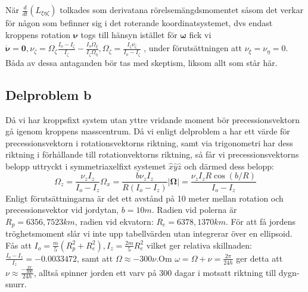 \documentclass[12pt,a4paper]{article}
\begin{document}
När $\frac{d}{dt}(L_{\xi\eta\zeta})$ tolkades som derivatana rörelsemängdsmomentet såsom det verkar för någon som befinner sig i det roterande koordinatsystemet, dvs endast kroppens rotation $\boldsymbol{\nu}$ togs till hänsyn istället för $\boldsymbol{\omega}$ fick vi $\dot{\boldsymbol{\nu}} = \mathbf{0} , \nu_{\zeta} = \Omega_{\zeta}\frac{I_o-I_{\zeta}}{I_{\zeta}} - \frac{I_o \dot{\Omega}_{\xi}}{I_{\zeta} \Omega_{\eta}} , \Omega_{\zeta} = \frac{I_{\zeta} \nu_{\zeta}}{I_o-I_{\zeta}}$ , under förutsättningen att $\nu_{\xi}=\nu_{\eta}=0$. Båda av dessa antaganden bör tas med skeptism, liksom allt som står här.

\subsection{Delproblem b}
Då vi har kroppsfixt system utan yttre vridande moment bör precessionsvektorn gå igenom kroppens masscentrum.  Då vi enligt delproblem a har ett värde för precessionsvektorn i rotationsvektorns riktning, samt via trigonometri har dess riktning i förhållande till rotationvektorns riktning, så får vi precessionsvektorns belopp uttryckt i symmetriaxelfixt systemet $\hat{x}\hat{y}\hat{z}$ och därmed dess belopp:
\begin{equation*}
\Omega_z = \frac{\nu_z I_z}{I_o-I_z}
\Omega_x = \frac{b \nu_z I_z}{R(I_o-I_z)}
|\boldsymbol{\Omega}|=\frac{\nu_z I_z R\cos(b/R)}{I_o-I_z}
\end{equation*}
Enligt förutsättningarna är det ett avstånd på 10 meter mellan rotation och precessionsvektor vid jordytan, $b=10m$. Radien vid polerna är $R_p= 6356,7523 km$, radien vid ekvatorn: $R_e=6378,1370 km$. För att få jordens tröghetsmoment slår vi inte upp tabellvärden utan integrerar över en ellipsoid. Fås att $I_o=\frac{m}{5}(R_p^2+R_e^2), I_z=\frac{2m}{5}R_e^2$ vilket ger relativa skillnaden: $\frac{I_o-I_z}{I_z} = -0.0033472$, samt att $\Omega \approx -300\nu$.Om $\omega=\Omega+\nu = \frac{2\pi}{24h}$ ger detta att $\nu \approx \frac{-\frac{2\pi}{300}}{24h}$, alltså spinner jorden ett varv på 300 dagar i motsatt riktning till dygn-snurr.
\\

\end{document}
